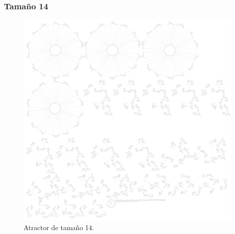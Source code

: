 \documentclass[11pt]{article}
\begin{document}
			\subsubsection{Tamaño 14}
			\begin{figure}[H]
			\centering
			\includegraphics[scale=0.1]{resources/Atractores54/atractor_54_size_14.png}
			\caption{Atractor de tamaño 14.}\label{fig:picture}
			\end{figure}
\end{document}

